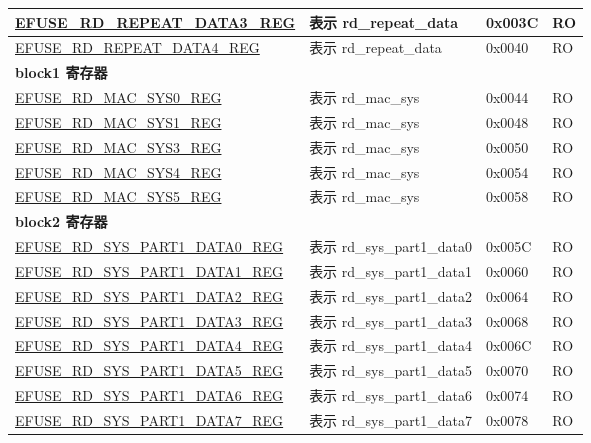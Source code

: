 \begin{longtable}{ | p{7cm} | p{6cm} | p{1.2cm} | p{1.5cm} | }
\hyperref[regdesc:EFUSERDREPEATDATA3REG]{EFUSE\_RD\_REPEAT\_DATA3\_REG} & 表示 rd\_repeat\_data & 0x003C & RO \\ \hline
\hyperref[regdesc:EFUSERDREPEATDATA4REG]{EFUSE\_RD\_REPEAT\_DATA4\_REG} & 表示 rd\_repeat\_data & 0x0040 & RO \\ \hline
\multicolumn{4}{|l|}{\textbf{block1 寄存器}} \\ \hline
\hyperref[regdesc:EFUSERDMACSYS0REG]{EFUSE\_RD\_MAC\_SYS0\_REG} & 表示 rd\_mac\_sys & 0x0044 & RO \\ \hline
\hyperref[regdesc:EFUSERDMACSYS1REG]{EFUSE\_RD\_MAC\_SYS1\_REG} & 表示 rd\_mac\_sys & 0x0048 & RO \\ \hline
\hyperref[regdesc:EFUSERDMACSYS3REG]{EFUSE\_RD\_MAC\_SYS3\_REG} & 表示 rd\_mac\_sys & 0x0050 & RO \\ \hline
\hyperref[regdesc:EFUSERDMACSYS4REG]{EFUSE\_RD\_MAC\_SYS4\_REG} & 表示 rd\_mac\_sys & 0x0054 & RO \\ \hline
\hyperref[regdesc:EFUSERDMACSYS5REG]{EFUSE\_RD\_MAC\_SYS5\_REG} & 表示 rd\_mac\_sys & 0x0058 & RO \\ \hline
\multicolumn{4}{|l|}{\textbf{block2 寄存器}} \\ \hline
\hyperref[regdesc:EFUSERDSYSPART1DATANREG]{EFUSE\_RD\_SYS\_PART1\_DATA0\_REG} & 表示 rd\_sys\_part1\_data0 & 0x005C & RO \\ \hline
\hyperref[regdesc:EFUSERDSYSPART1DATANREG]{EFUSE\_RD\_SYS\_PART1\_DATA1\_REG} & 表示 rd\_sys\_part1\_data1 & 0x0060 & RO \\ \hline
\hyperref[regdesc:EFUSERDSYSPART1DATANREG]{EFUSE\_RD\_SYS\_PART1\_DATA2\_REG} & 表示 rd\_sys\_part1\_data2 & 0x0064 & RO \\ \hline
\hyperref[regdesc:EFUSERDSYSPART1DATANREG]{EFUSE\_RD\_SYS\_PART1\_DATA3\_REG} & 表示 rd\_sys\_part1\_data3 & 0x0068 & RO \\ \hline
\hyperref[regdesc:EFUSERDSYSPART1DATANREG]{EFUSE\_RD\_SYS\_PART1\_DATA4\_REG} & 表示 rd\_sys\_part1\_data4 & 0x006C & RO \\ \hline
\hyperref[regdesc:EFUSERDSYSPART1DATANREG]{EFUSE\_RD\_SYS\_PART1\_DATA5\_REG} & 表示 rd\_sys\_part1\_data5 & 0x0070 & RO \\ \hline
\hyperref[regdesc:EFUSERDSYSPART1DATANREG]{EFUSE\_RD\_SYS\_PART1\_DATA6\_REG} & 表示 rd\_sys\_part1\_data6 & 0x0074 & RO \\ \hline
\hyperref[regdesc:EFUSERDSYSPART1DATANREG]{EFUSE\_RD\_SYS\_PART1\_DATA7\_REG} & 表示 rd\_sys\_part1\_data7 & 0x0078 & RO \\ \hline

\end{longtable}
